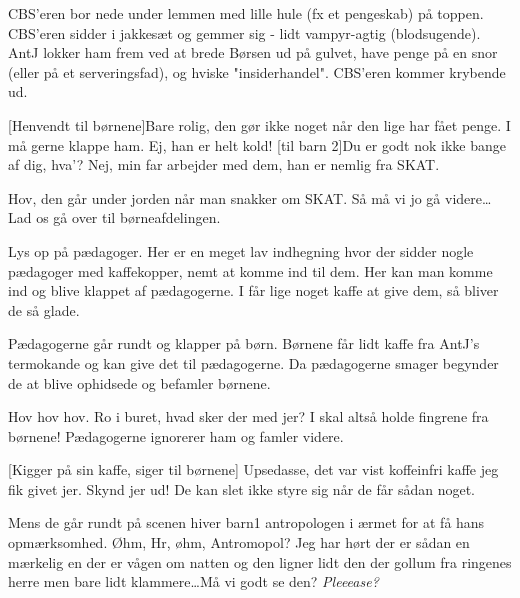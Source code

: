 \documentclass[a4paper,12pt]{article}
\begin{document}
\begin{sketch}
\scene CBS'eren bor nede under lemmen med lille hule (fx et pengeskab) på toppen. CBS'eren sidder i jakkesæt og gemmer sig - lidt vampyr-agtig (blodsugende). AntJ lokker ham frem ved at brede Børsen ud på gulvet, have penge på en snor (eller på et serveringsfad), og hviske "insiderhandel". CBS'eren kommer krybende ud.

[Henvendt til børnene]Bare rolig, den gør ikke noget når den lige har fået penge. I må gerne klappe ham.
Ej, han er helt kold!
[til barn 2]Du er godt nok ikke bange af dig, hva'?
Nej, min far arbejder med dem, han er nemlig fra SKAT.

Hov, den går under jorden når man snakker om SKAT. Så må vi jo gå videre\ldots Lad os gå over til børneafdelingen.

\scene Lys op på pædagoger. Her er en meget lav indhegning hvor der sidder nogle pædagoger med kaffekopper, nemt at komme ind til dem.
Her kan man komme ind og blive klappet af pædagogerne. I får lige noget kaffe at give dem, så bliver de så glade.

\scene Pædagogerne går rundt og klapper på børn. Børnene får lidt kaffe fra AntJ's termokande og kan give det til pædagogerne. Da pædagogerne smager begynder de at blive ophidsede og befamler børnene.

Hov hov hov. Ro i buret, hvad sker der med jer? I skal altså holde fingrene fra børnene!
\scene Pædagogerne ignorerer ham og famler videre.

[Kigger på sin kaffe, siger til børnene] Upsedasse, det var vist koffeinfri kaffe jeg fik givet jer. Skynd jer ud! De kan slet ikke styre sig når de får sådan noget.

 

\scene Mens de går rundt på scenen hiver barn1 antropologen i ærmet for at få hans opmærksomhed.
Øhm, Hr, øhm, Antromopol? Jeg har hørt der er sådan en mærkelig en der er vågen om natten og den ligner lidt den der gollum fra ringenes herre men bare lidt klammere\ldots Må vi godt se den? \emph{Pleeease?}


\end{sketch}
\end{document}
